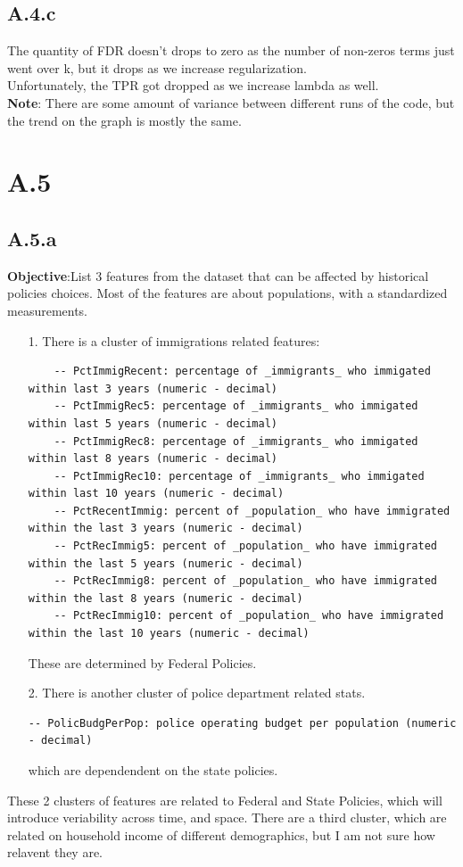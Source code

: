 \documentclass[]{article}
\begin{document}
    \subsection*{A.4.c}
        The quantity of FDR doesn't drops to zero as the number of non-zeros terms just went over k, but it drops as we increase regularization. 
        \\
        Unfortunately, the TPR got dropped as we increase lambda as well. 
        \\
        \textbf{Note}: There are some amount of variance between different runs of the code, but the trend on the graph is mostly the same. 

\section*{A.5}
    \subsection*{A.5.a}
        \textbf{Objective}:List 3 features from the dataset that can be affected by historical policies choices. Most of the features are about populations, with a standardized measurements. 
        \\
        \begin{enumerate}
            \item[1.] There is a cluster of immigrations related features: 
                \begin{lstlisting}
    -- PctImmigRecent: percentage of _immigrants_ who immigated within last 3 years (numeric - decimal)
    -- PctImmigRec5: percentage of _immigrants_ who immigated within last 5 years (numeric - decimal)
    -- PctImmigRec8: percentage of _immigrants_ who immigated within last 8 years (numeric - decimal)
    -- PctImmigRec10: percentage of _immigrants_ who immigated within last 10 years (numeric - decimal)
    -- PctRecentImmig: percent of _population_ who have immigrated within the last 3 years (numeric - decimal)
    -- PctRecImmig5: percent of _population_ who have immigrated within the last 5 years (numeric - decimal)
    -- PctRecImmig8: percent of _population_ who have immigrated within the last 8 years (numeric - decimal)
    -- PctRecImmig10: percent of _population_ who have immigrated within the last 10 years (numeric - decimal)
                \end{lstlisting}
                These are determined by Federal Policies. 
            \item[2.] There is another cluster of police department related stats. 
            \begin{lstlisting}
-- PolicBudgPerPop: police operating budget per population (numeric - decimal)
            \end{lstlisting}
            which are dependendent on the state policies. 
        \end{enumerate}
        These 2 clusters of features are related to Federal and State Policies, which will introduce veriability across time, and space. There are a third cluster, which are related on household income of different demographics, but I am not sure how relavent they are. 
\end{document}
